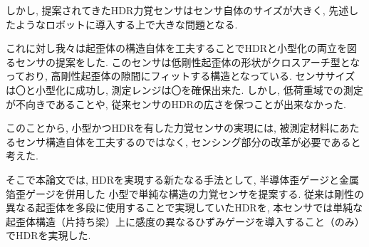
しかし, 提案されてきたHDR力覚センサはセンサ自体のサイズが大きく, 
先述したようなロボットに導入する上で大きな問題となる.

これに対し我々は起歪体の構造自体を工夫することでHDRと小型化の両立を図るセンサの提案をした. 
このセンサは低剛性起歪体の形状がクロスアーチ型となっており, 
高剛性起歪体の隙間にフィットする構造となっている. センササイズは〇と小型化に成功し, 
測定レンジは〇を確保出来た.
しかし, 低荷重域での測定が不向きであることや, 
従来センサのHDRの広さを保つことが出来なかった. 


このことから, 小型かつHDRを有した力覚センサの実現には, 
被測定材料にあたるセンサ構造自体を工夫するのではなく, 
センシング部分の改革が必要であると考えた. 

そこで本論文では, HDRを実現する新たなる手法として, 半導体歪ゲージと金属箔歪ゲージを併用した
小型で単純な構造の力覚センサを提案する. 
従来は剛性の異なる起歪体を多段に使用することで実現していたHDRを, 
本センサでは単純な起歪体構造（片持ち梁）上に感度の異なるひずみゲージを導入すること（のみ）でHDRを実現した. 


